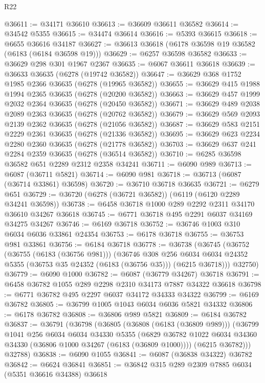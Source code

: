 \begin{lexlean}{R22}
\begin{coremodule}
@36611 := @34171 @36610
@36613 := @36609 @36611 @36582
@36614 := @34542 @5355
@36615 := @34474 @36614
@36616 := @5393 @36615
@36618 := @6655 @36616 @34187
@36627 := @36613 @36618 (@6178 @36598 @19 @36582 (@6183 (@6184 @36598 @19)))
@36629 := @6257 @36598 @36582
@36633 := @36629 @298 @301 @1967 @2367
@36635 := @6067 @36611 @36618
@36639 := @36633 @36635 (@6278 (@19742 @36582))
@36647 := @36629 @368 @1752 @1985 @2366 @36635 (@6278 (@19965 @36582))
@36655 := @36629 @415 @1988 @1994 @2365 @36635 (@6278 (@20200 @36582))
@36663 := @36629 @457 @1999 @2032 @2364 @36635 (@6278 (@20450 @36582))
@36671 := @36629 @489 @2038 @2089 @2363 @36635 (@6278 (@20762 @36582))
@36679 := @36629 @569 @2093 @2139 @2362 @36635 (@6278 (@21056 @36582))
@36687 := @36629 @583 @2151 @2229 @2361 @36635 (@6278 (@21336 @36582))
@36695 := @36629 @623 @2234 @2280 @2360 @36635 (@6278 (@21778 @36582))
@36703 := @36629 @637 @241 @2284 @2359 @36635 (@6278 (@36514 @36582))
@36710 := @6285 @36598 @36582 @651 @2289 @2312 @2358 @34241
@36711 := @6090 @989
@36713 := @6087 (@36711 @5821)
@36714 := @6090 @981
@36718 := @36713 (@6087 (@36714 @33861) @36598)
@36720 := @36710 @36718 @36635
@36721 := @6279 @651
@36729 := @36720 (@6278 (@36721 @36582)) (@6119 (@6120 @2289 @34241 @36598))
@36738 := @6458 @36718 @1000 @289 @2292 @2311 @34170 @36610 @34267 @36618
@36745 := @6771 @36718 @495 @2291 @6037 @34169 @34275 @34267
@36746 := @6169 @36718
@36752 := @36746 @1003 @310 @6034 @6036 @33861 @24354
@36753 := @6178 @36718
@36755 := @36753 @981 @33861
@36756 := @6184 @36718
@36778 := @36738
    (@36745
      (@36752
        (@36755 (@6183 (@36756 @981)))
        (@36746
          @308
          @256
          @6034
          @6034
          @24352
          @5355
          (@36753 @35 @24352 (@6183 (@36756 @35)))
          (@6215 @36718)))
      @32750)
@36779 := @6090 @1000
@36782 := @6087 (@36779 @34267) @36718
@36791 := @6458 @36782 @1055 @289 @2298 @2310 @34173 @7887 @34322 @36618
@36798 := @6771 @36782 @495 @2297 @6037 @34172 @34333 @34322
@36799 := @6169 @36782
@36805 := @36799 @1005 @1043 @6034 @6036 @5821 @34332
@36806 := @6178 @36782
@36808 := @36806 @989 @5821
@36809 := @6184 @36782
@36837 := @36791
    (@36798
      (@36805
        (@36808 (@6183 (@36809 @989)))
        (@36799
          @1041
          @256
          @6034
          @6034
          @34330
          @5355
          (@6829 @36782 @1022 @6034 @34360 @34330 (@36806 @1000 @34267 (@6183 (@36809 @1000))))
          (@6215 @36782)))
      @32788)
@36838 := @6090 @1055
@36841 := @6087 (@36838 @34322) @36782
@36842 := @6624 @36841
@36851 := @36842 @315 @289 @2309 @7885 @6034 (@5351 @36616 @34388) @36618

\end{coremodule}
\end{lexlean}
